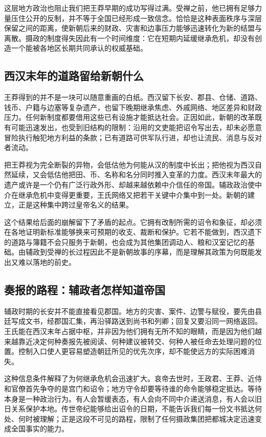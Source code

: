 这层地方政治也阻止我们把王莽早期的成功写得过满。受禅之前，他已拥有足够力量压住公开的反制，并不等于全国已经形成一致信念。恰恰是这种表面秩序与深层保留之间的距离，使新朝后来的财政、灾害和边事压力能够迅速转化为新的结盟与离散。摄政的制度得失因此有一个时间维度：它在短期内延缓继承危机，却没有创造一个能被各地区长期共同承认的权威基础。

\subsection{西汉末年的道路留给新朝什么}

王莽得到的并不是一块可以随意重画的白纸。西汉留下长安、郡县、仓储、道路、钱币、户籍与边塞等复杂遗产，也留下晚期继承焦虑、外戚网络、地区差异和财政压力。任何新制度都要借用这些已有设施才能抵达社会。正因如此，新朝的改革既有可能迅速发出，也受到旧结构的限制：沿用的文吏能把诏令写出去，却未必愿意冒险执行触犯地方利益的条款；已有道路可供军队行进，却也让流民、消息与反对者流动。

把王莽视为完全断裂的异物，会低估他为何能从汉的制度中长出；把他视为西汉自然延续，又会低估他把田、币、名称和名分同时推入变革的力度。西汉末年最大的遗产或许是一个仍有广泛行政外形、却越来越依赖中介信任的帝国。辅政政治使中介在继承危机中变得更重要，王氏网络又把若干关键中介集中到一处。新朝的建立，正是这种集中跨过皇帝名义的结果。

这个结果给后面的崩解留下了矛盾的起点。它拥有改制所需的诏令和象征，却必须在各地证明新标准能够换来可预期的收支、裁断和保护。它若不能做到，西汉遗下的道路与簿籍不会只服务于新朝，也会成为其他集团调动人、粮和汉室记忆的基础。由辅政到受禅的长过程因此不是新朝故事的序幕，而是理解其政策为何既能发出又难以落地的前史。

\subsection{奏报的路程：辅政者怎样知道帝国}

辅政时期的长安并不能直接看见郡国。地方的灾害、案件、边警与赋役，要先由县廷写成文书，经郡国汇集，再沿驿路送到尚书和列卿；回复又要沿同一网络返回。王氏能在西汉末年占据中枢，并非因为他们拥有无所不知的眼睛，而是因为他们越来越靠近决定何种奏报先被阅读、何种建议被转交、何种人被任命去处理问题的位置。控制入口使人更容易塑造朝廷所见的优先次序，却不能使远方的实际困难消失。

这种信息条件解释了为何继承危机会迅速扩大。哀帝去世时，王政君、王莽、近侍和官僚首先争夺的是宫门和诏令；地方守令却要等待谁的命令能够稳定抵达。等待本身是一种政治行为。有人会暂缓表态，有人会向不同中介递送消息，有人会以旧日关系保护本地。传世帝纪能够给出诏令的日期，不能告诉我们每一份文书抵达何处、何时被理解；正是这段不可见的路程，限制了任何摄政集团把都城决定迅速变成全国事实的能力。

